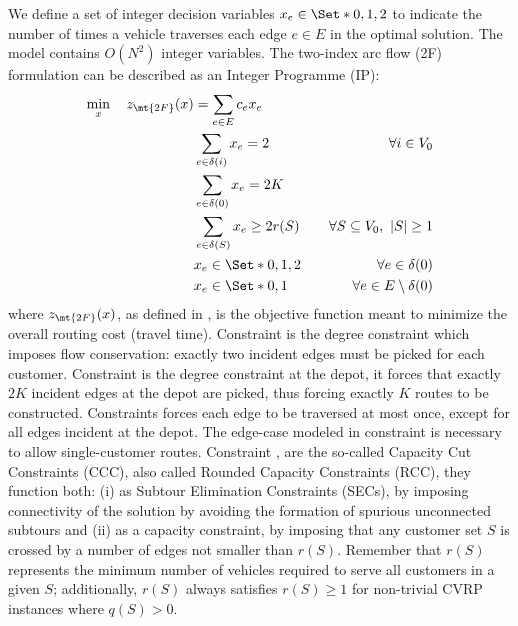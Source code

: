 We define a set of integer decision variables $x_e \in \Set*{0, 1, 2}$ to indicate the number of times
a vehicle traverses each edge $e \in E$ in the optimal solution.
The model contains $O(N^2)$ integer variables.
The two-index arc flow (2F) formulation can be described as an Integer Programme (IP):
\begin{align}
	\min_{x} \quad z_\mt{2F}(x) & = \sum_{e \in E} c_e x_e                 & \label{eq:two-index-flow-obj-func}                                                   \\
	                            & \sum_{e \in \delta(i)} x_e = 2           & \quad \forall i \in V_0 \label{eq:two-index-flow-two-edges-incident-per-customer}    \\
	                            & \sum_{e \in \delta(0)} x_e = 2 K         & \label{eq:two-index-flow-two-k-edges-incident-in-the-depot-node}                     \\
	                            & \sum_{e \in \delta(S)} x_e \ge 2 r(S)    & \quad \forall S \subseteq V_0,\ |S| \ge 1 \label{eq:two-index-flow-ccc}              \\
	                            & x_e                   \in \Set*{0, 1, 2} & \quad \forall e \in \delta(0) \label{eq:two-index-flow-x-mip-var-bounds-depot}       \\
	                            & x_e                   \in \Set*{0, 1}    & \quad \forall e \in E \setminus \delta(0) \label{eq:two-index-flow-x-mip-var-bounds}
\end{align}
where $z_\mt{2F}(x)$, as defined in , is the objective function meant to minimize the overall routing cost (travel time).
Constraint  is the degree constraint which imposes flow conservation: exactly two incident edges must be picked for each customer.
Constraint  is the degree constraint at the depot, it forces that exactly $2K$ incident edges at the depot are picked, thus forcing exactly $K$ routes to be constructed.
Constraints  forces each edge to be traversed at most once,
except for all edges incident at the depot.
The edge-case modeled in constraint  is necessary to allow single-customer routes.
Constraint , are the so-called Capacity Cut Constraints (CCC), also called Rounded Capacity Constraints (RCC), they function both:
(i) as Subtour Elimination Constraints (SECs),
by imposing connectivity of the solution by avoiding the formation of spurious unconnected subtours
and (ii) as a capacity constraint,
by imposing that any customer set $S$ is crossed by a number of edges not smaller than $r(S)$.
Remember that $r(S)$ represents the minimum number of vehicles required to serve all customers in a given $S$;
additionally, $r(S)$ always satisfies $r(S) \ge 1$ for non-trivial CVRP instances where $q(S) > 0$.

